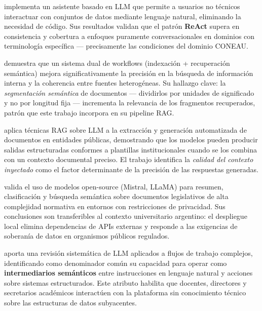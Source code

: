 \citet{garcia2025desarrollo} implementa un asistente basado en LLM que permite a usuarios no técnicos interactuar con conjuntos de datos mediante lenguaje natural, eliminando la necesidad de código. Sus resultados validan que el patrón \textbf{ReAct} supera en consistencia y cobertura a enfoques puramente conversacionales en dominios con terminología específica --- precisamente las condiciones del dominio CONEAU.

\citet{farsane2025automatizacion} demuestra que un sistema dual de workflows (indexación + recuperación semántica) mejora significativamente la precisión en la búsqueda de información interna y la coherencia entre fuentes heterogéneas. Su hallazgo clave: la \emph{segmentación semántica} de documentos --- dividirlos por unidades de significado y no por longitud fija --- incrementa la relevancia de los fragmentos recuperados, patrón que este trabajo incorpora en su pipeline RAG.

\citet{collado2024implementacion} aplica técnicas RAG sobre LLM a la extracción y generación automatizada de documentos en entidades públicas, demostrando que los modelos pueden producir salidas estructuradas conformes a plantillas institucionales cuando se los combina con un contexto documental preciso. El trabajo identifica la \emph{calidad del contexto inyectado} como el factor determinante de la precisión de las respuestas generadas.

\citet{torres2024desarrollo} valida el uso de modelos open-source (Mistral, LLaMA) para resumen, clasificación y búsqueda semántica sobre documentos legislativos de alta complejidad normativa en entornos con restricciones de privacidad. Sus conclusiones son transferibles al contexto universitario argentino: el despliegue local elimina dependencias de APIs externas y responde a las exigencias de soberanía de datos en organismos públicos regulados.

\citet{he2025llm} aporta una revisión sistemática de LLM aplicados a flujos de trabajo complejos, identificando como denominador común su capacidad para operar como \textbf{intermediarios semánticos} entre instrucciones en lenguaje natural y acciones sobre sistemas estructurados. Este atributo habilita que docentes, directores y secretarios académicos interactúen con la plataforma sin conocimiento técnico sobre las estructuras de datos subyacentes.

